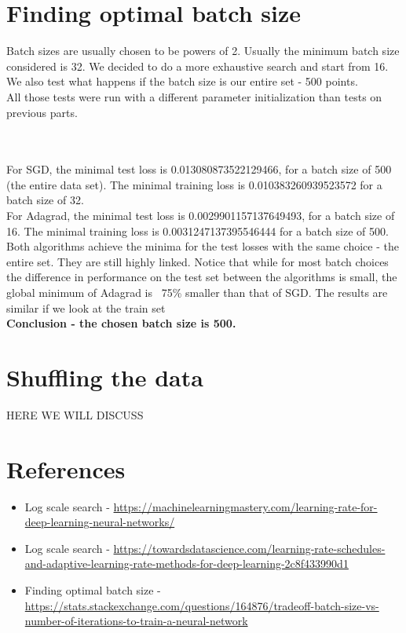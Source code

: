 \documentclass[12pt]{scrartcl}
\begin{document}
\section{Finding optimal batch size}
Batch sizes are usually chosen to be powers of 2. Usually the minimum batch size considered is 32. We decided to do a more exhaustive search and start from 16. We also test what happens if the batch size is our entire set - 500 points.\\
All those tests were run with a different parameter initialization than tests on previous parts.

\\\\

For SGD, the minimal test loss is 0.013080873522129466, for a batch size of 500 (the entire data set). The minimal training loss is 0.010383260939523572 for a batch size of 32.\\
For Adagrad, the minimal test loss is 0.0029901157137649493, for a batch size of 16. The minimal training loss is 0.0031247137395546444  for a batch size of 500.\\
Both algorithms achieve the minima for the test losses with the same choice - the entire set. They are still highly linked. Notice that while for most batch choices the difference in performance on the test set between the algorithms is small, the global minimum of Adagrad is ~75\% smaller than that of SGD. The results are similar if we look at the train set\\
\textbf{Conclusion - the chosen batch size is 500.}

\section{Shuffling the data}
HERE WE WILL DISCUSS

\section{References}
\begin{itemize}
\item Log scale search - \url{https://machinelearningmastery.com/learning-rate-for-deep-learning-neural-networks/}

\item Log scale search - \url{https://towardsdatascience.com/learning-rate-schedules-and-adaptive-learning-rate-methods-for-deep-learning-2c8f433990d1}

\item Finding optimal batch size - \url{https://stats.stackexchange.com/questions/164876/tradeoff-batch-size-vs-number-of-iterations-to-train-a-neural-network}
\end{itemize}
\end{document}
